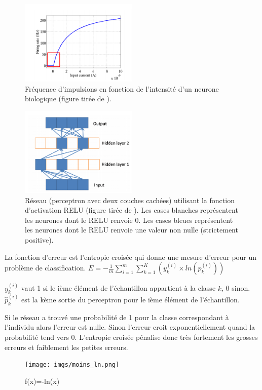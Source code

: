 \documentclass[a4paper,11pt,oneside,roman]{article}
\begin{document}
    \begin{figure}
        \centering
        \includegraphics[width=0.5\textwidth]{imgs/firing_rate.png}
        \caption{Fréquence d'impulsions en fonction de l'intensité d'un neurone biologique (figure tirée de \cite{pmlr-v15-glorot11a}).}
        \label{fig_firing_rate}
    \end{figure}

    \begin{figure}
        \centering
        \includegraphics[width=0.5\textwidth]{imgs/sparsity.png}
        \caption{Réseau (perceptron avec deux couches cachées) utilisant la fonction d'activation RELU (figure tirée de \cite{pmlr-v15-glorot11a}). 
        Les cases blanches représentent les neurones dont le RELU renvoie 0. 
        Les cases bleues représentent les neurones dont le RELU renvoie une valeur non nulle (strictement positive).}
        \label{fig_sparsity}
    \end{figure}

    La fonction d'erreur est l'entropie croisée qui donne une mesure d'erreur pour un problème de classification.
    $E = -\frac{1}{m} \sum\limits_{i=1}^m\sum\limits_{k=1}^K (y_{k}^{(i)} \times ln(\hat{p}_{k}^{(i)}))$

    $y_{k}^{(i)}$ vaut 1 si le ième élément de l'échantillon appartient à la classe $k$, 0 sinon. $\hat{p}_{k}^{(i)}$ est la kème sortie du perceptron pour le ième élément de l'échantillon.
    
    Si le réseau a trouvé une probabilité de 1 pour la classe correspondant à l'individu alors l'erreur est nulle.
    Sinon l'erreur croit exponentiellement quand la probabilité tend vers 0. L'entropie croisée pénalise donc très fortement les grosses erreurs et faiblement les petites erreurs.
    \begin{figure}
        \centering
        \texttt{[image: imgs/moins\_ln.png]}
        \caption{f(x)=-ln(x)}
        \label{fig_moins_ln}
    \end{figure}
\end{document}
